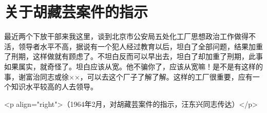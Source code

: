 \section[关于胡藏芸案件的指示（一九六四年二月）]{关于胡藏芸案件的指示}


最近两个下放干部来我这里，谈到北京市公安局五处化工厂思想政治工作做得不活，领导者水平不高，据说有一个犯人经过教育以后，坦白了全部问题，结果加重了刑期，这样做就有顾虑了。不坦白反而可以早出去，坦白了却加重了刑期，此事如果属实，就奇怪了。坦白应该从宽。他不骗你了，应该从宽嘛！是不是有这样的事，谢富治同志或徐××，可以去这个厂子了解了解。这样的工厂很重要，应有一个知识水平较高的人去领导。

<p align="right">（1964年2月，对胡藏芸案件的指示，汪东兴同志传达）</p>


